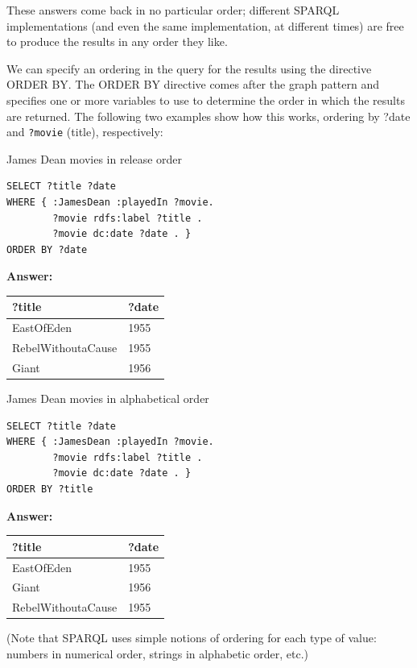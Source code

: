 These answers come back in no particular order; different SPARQL
implementations (and even the same implementation, at different times)
are free to produce the results in any order they like.

We can specify an ordering in the query for the results using the
directive ORDER BY. The ORDER BY directive comes after the graph pattern
and specifies one or more variables to use to determine the order in
which the results are returned. The following two examples show how this
works, ordering by 
?date and \texttt{?movie} (title), respectively:

\begin{query}James Dean movies in release order\end{query}

\begin{lstlisting}
SELECT ?title ?date
WHERE { :JamesDean :playedIn ?movie.
        ?movie rdfs:label ?title .
        ?movie dc:date ?date . }
ORDER BY ?date
\end{lstlisting}

\textbf{\textbf{Answer:}}

\begin{tabular}{|ll|}
\hline
?title&?date\\
\hline
EastOfEden&1955\\
RebelWithoutaCause&1955\\
Giant&1956\\
\hline
\end{tabular}

\begin{query}James Dean movies in alphabetical order\end{query}

\begin{lstlisting}
SELECT ?title ?date
WHERE { :JamesDean :playedIn ?movie.
        ?movie rdfs:label ?title .
        ?movie dc:date ?date . }
ORDER BY ?title
\end{lstlisting}

\textbf{\textbf{Answer:}}

\begin{tabular}{|ll|}
\hline
?title&?date\\
\hline
EastOfEden&1955\\
Giant&1956\\
RebelWithoutaCause&1955\\
\hline
\end{tabular}

(Note that SPARQL uses simple notions of ordering for each type of
value: numbers in numerical order, strings in alphabetic order, etc.)

